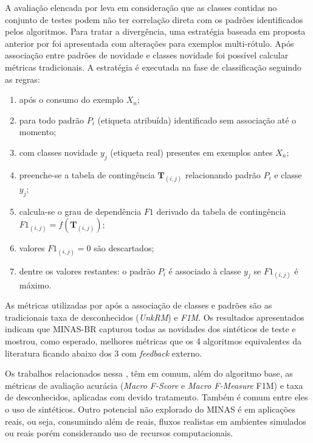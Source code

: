
A avaliação elencada por  leva em consideração que as classes
contidas no conjunto de testes podem não ter correlação direta com os padrões identificados
pelos algoritmos.
Para tratar a divergência, uma estratégia baseada em proposta anterior por
 foi apresentada com alterações para exemplos multi-rótulo.
Após associação entre padrões de novidade e classes novidade foi possível calcular
métricas tradicionais.
A estratégia é executada na fase de classificação seguindo as regras:

\begin{enumerate}

    \item após o consumo do exemplo $X_n$;
    
    \item para todo padrão $P_i$ (etiqueta atribuída) identificado sem
    associação até o momento;
    
    \item com classes novidade $y_j$ (etiqueta real) presentes em exemplos antes
    $X_n$;
    
    \item preenche-se a tabela de contingência $\mathbf{T}_{(i,j)}$ relacionando
    padrão $P_i$ e classe $y_j$;
    
    \item calcula-se o grau de dependência $\mathit{F1}$ derivado da tabela de
    contingência $\mathit{F1}_{(i,j)} = f(\mathbf{T}_{(i,j)})$;
    
    \item valores $\mathit{F1}_{(i,j)} = 0$ são descartados;
    
    \item dentre os valores restantes: o padrão $P_i$ é associado à classe $y_j$
    se $\mathit{F1}_{(i,j)}$ é máximo.

\end{enumerate}

As métricas utilizadas por  após a associação de classes e
padrões são as tradicionais taxa de desconhecidos (\emph{UnkRM}) e \emph{F1M}.
Os resultados apresentados indicam que MINAS-BR capturou todas as novidades dos
\datasets sintéticos de teste e mostrou, como esperado, melhores métricas que os
4 algoritmos equivalentes da literatura ficando abaixo dos 3 com \emph{feedback}
externo.

Os trabalhos relacionados nessa , têm em
comum, além do algoritmo base, as métricas de avaliação acurácia (\emph{Macro F-Score} e \emph{Macro
F-Measure} F1M) e taxa de desconhecidos, aplicadas com devido tratamento.
Também é comum entre eles o uso de \datasets sintéticos.
Outro potencial não explorado do MINAS é em aplicações reais, ou seja,
consumindo além de \datasets reais, fluxos realistas em ambientes simulados ou
reais porém considerando uso de recursos computacionais.

